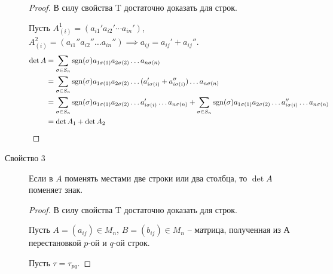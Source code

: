 \begin{description}
    \begin{proof}
        В силу свойства T достаточно доказать для строк.

        Пусть $A_{(i)}^1 = (a_{i1}' a_{i2}' \cdots a_{in}')$, $A_{(i)}^2 = (a_{i1}'' a_{i2}'' \dots a_{in}'') \implies a_{ij} = a_{ij}' + a_{ij}''$.
        \begin{align*}
            \det A
            &= \sum_{\sigma \in S_n} \operatorname{\mathop{\mathrm{sgn}}}(\sigma) a_{1\sigma(1)} a_{2\sigma(2)} \dots a_{n\sigma(n)} \\
            &= \sum_{\sigma \in S_n} \operatorname{\mathop{\mathrm{sgn}}}(\sigma) a_{1\sigma(1)} a_{2\sigma(2)} \dots (a'_{i\sigma(i)} + a''_{i\sigma(i)}) \dots a_{n \sigma(n)} \\
            &= \sum_{\sigma \in S_n} \operatorname{\mathop{\mathrm{sgn}}}(\sigma) a_{1\sigma(1)} a_{2\sigma(2)} \dots a'_{i\sigma(i)} \dots a_{n\sigma(n)} + \sum_{\sigma \in S_n} \operatorname{\mathop{\mathrm{sgn}}}(\sigma) a_{1\sigma(1)} a_{2\sigma(2)} \dots a''_{i\sigma(i)} \dots a_{n\sigma(n)} \\
            &= \det A_1 + \det A_2
        \end{align*}
    \end{proof}

\item[Свойство 3]
    Если в $A$ поменять местами две строки или два столбца, то $\det A$ поменяет знак.

    \begin{proof}
        В силу свойства T достаточно доказать для строк.

        Пусть $A = (a_{ij}) \in M_n$, $B = (b_{ij}) \in M_n $ -- матрица, полученная из А перестановкой $p$-ой и $q$-ой строк.

        Пусть $\tau = \tau_{pq}$.


\end{proof}
\end{description}
